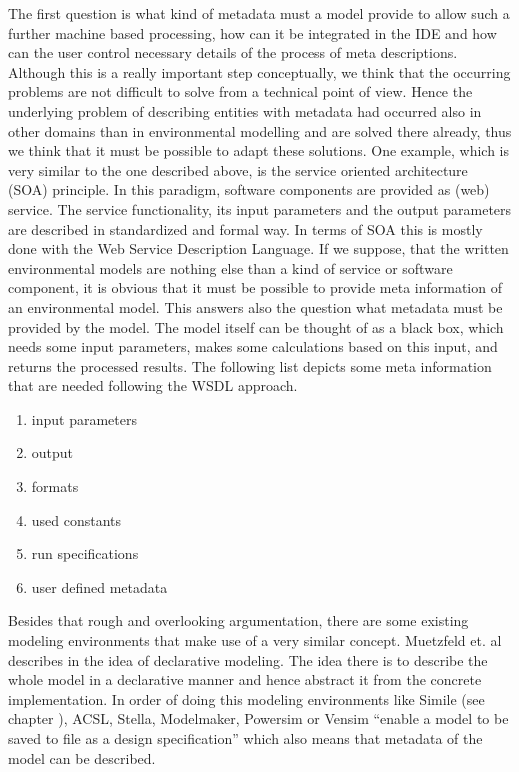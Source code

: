 The first question is what kind of metadata must a model provide to allow such a further machine based processing, how can it be integrated in the IDE and how can the user control necessary details of the process of meta descriptions.
Although this is a really important step conceptually, we think that the occurring problems are not difficult to solve from a technical point of view. Hence the underlying problem of describing entities with metadata had occurred also in other domains than in environmental modelling and are solved there already, thus we think that it must be possible to adapt these solutions.
One example, which is very similar to the one described above, is the service oriented architecture (SOA) principle. In this paradigm, software components are provided as (web) service. The service functionality, its input parameters and the output parameters are described in standardized and formal way. In terms of SOA this is mostly done with the Web Service Description Language. If we suppose, that the written environmental models are nothing else than a kind of service or software component, it is obvious that it must be possible to provide meta information of an environmental model. This answers also the question what metadata must be provided by the model. The model itself can be thought of as a black box, which needs some input parameters, makes some calculations based on this input, and returns the processed results. The following list depicts some meta information that are needed following the WSDL approach. \autocite{dsl:muetzelfeldt}

\begin{enumerate}
\item input parameters
\item output
\item formats
\item used constants
\item run specifications
\item user defined metadata
\end{enumerate}


Besides that rough and overlooking argumentation, there are some existing modeling environments that make use of a very similar concept. Muetzfeld et. al describes in \autocite{dsl:muetzelfeldt} the idea of declarative modeling. The idea there is to describe the whole model in a declarative manner and hence abstract it from the concrete implementation. In order of doing this modeling environments like Simile (see chapter ), ACSL, Stella, Modelmaker, Powersim or Vensim ``enable a model to be saved to file as a design specification'' \autocite[32]{dsl:muetzelfeldt} which also means that metadata of the model can be described.


